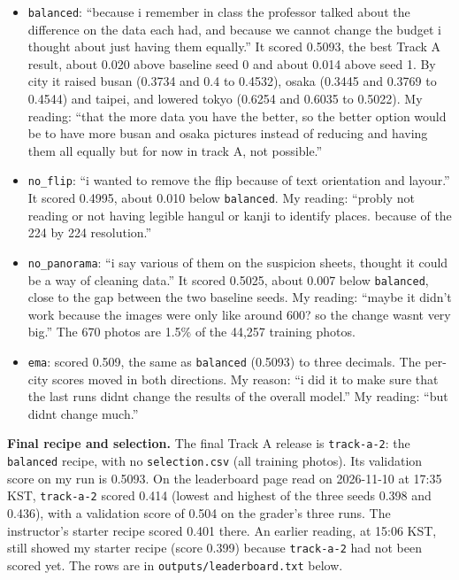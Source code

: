 \documentclass[11pt]{article}
\begin{document}
\begin{itemize}
  \item \texttt{balanced}: ``because i remember in class the professor talked
  about the difference on the data each had, and because we cannot change the
  budget i thought about just having them equally.'' It scored 0.5093, the
  best Track A result, about 0.020 above baseline seed 0 and about 0.014
  above seed 1. By city it raised busan (0.3734 and 0.4 to 0.4532), osaka
  (0.3445 and 0.3769 to 0.4544) and taipei, and lowered tokyo (0.6254 and
  0.6035 to 0.5022). My reading: ``that the more data you have the better, so
  the better option would be to have more busan and osaka pictures instead of
  reducing and having them all equally but for now in track A, not
  possible.''
  \item \texttt{no\_flip}: ``i wanted to remove the flip because of text
  orientation and layour.'' It scored 0.4995, about 0.010 below
  \texttt{balanced}. My reading: ``probly not reading or not having legible
  hangul or kanji to identify places. because of the 224 by 224
  resolution.''
  \item \texttt{no\_panorama}: ``i say various of them on the suspicion
  sheets, thought it could be a way of cleaning data.'' It scored 0.5025,
  about 0.007 below \texttt{balanced}, close to the gap between the two
  baseline seeds. My reading: ``maybe it didn't work because the images were
  only like around 600? so the change wasnt very big.'' The 670 photos are
  1.5\% of the 44,257 training photos.
  \item \texttt{ema}: scored 0.509, the same as \texttt{balanced} (0.5093)
  to three decimals. The per-city scores moved in both directions. My
  reason: ``i did it to make sure that the last runs didnt change the results
  of the overall model.'' My reading: ``but didnt change much.''
\end{itemize}

\textbf{Final recipe and selection.} The final Track A release is
\texttt{track-a-2}: the \texttt{balanced} recipe, with no \texttt{selection.csv}
(all training photos). Its validation score on my run is 0.5093. On the
leaderboard page read on 2026-11-10 at 17:35 KST, \texttt{track-a-2} scored
0.414 (lowest and highest of the three seeds 0.398 and 0.436), with a
validation score of 0.504 on the grader's three runs. The instructor's
starter recipe scored 0.401 there. An earlier reading, at 15:06 KST, still
showed my starter recipe (score 0.399) because \texttt{track-a-2} had not been
scored yet. The rows are in \texttt{outputs/leaderboard.txt} below.
\end{document}
